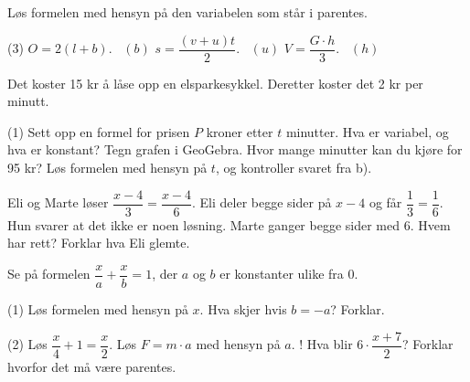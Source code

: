 Løs formelen med hensyn på den variabelen som står i parentes.
\begin{tasks}(3)
  \task $O = 2(l + b)$. \ $(b)$
  \task $s = \dfrac{(v+u)t}{2}$. \ $(u)$
  \task $V = \dfrac{G \cdot h}{3}$. \ $(h)$
\end{tasks}

Det koster 15 kr å låse opp en elsparkesykkel. Deretter koster det 2 kr per minutt.
\begin{tasks}(1)
  \task Sett opp en formel for prisen $P$ kroner etter $t$ minutter. Hva er variabel, og hva er konstant?
  \task Tegn grafen i GeoGebra. Hvor mange minutter kan du kjøre for 95 kr?
  \task Løs formelen med hensyn på $t$, og kontroller svaret fra b).
\end{tasks}


Eli og Marte løser $\dfrac{x-4}{3} = \dfrac{x-4}{6}$.
Eli deler begge sider på $x - 4$ og får $\dfrac{1}{3} = \dfrac{1}{6}$. Hun svarer at det ikke er noen løsning.
Marte ganger begge sider med 6. Hvem har rett? Forklar hva Eli glemte.

Se på formelen $\dfrac{x}{a} + \dfrac{x}{b} = 1$, der $a$ og $b$ er konstanter ulike fra 0.
\begin{tasks}(1)
  \task Løs formelen med hensyn på $x$.
  \task Hva skjer hvis $b = -a$? Forklar.
\end{tasks}

\begin{sjekk}
\begin{tasks}(2)
  \task Løs $\dfrac{x}{4} + 1 = \dfrac{x}{2}$.
  \task Løs $F = m \cdot a$ med hensyn på $a$.
  \task! Hva blir $6\cdot\dfrac{x+7}{2}$? Forklar hvorfor det må være parentes.
\end{tasks}
\end{sjekk}
